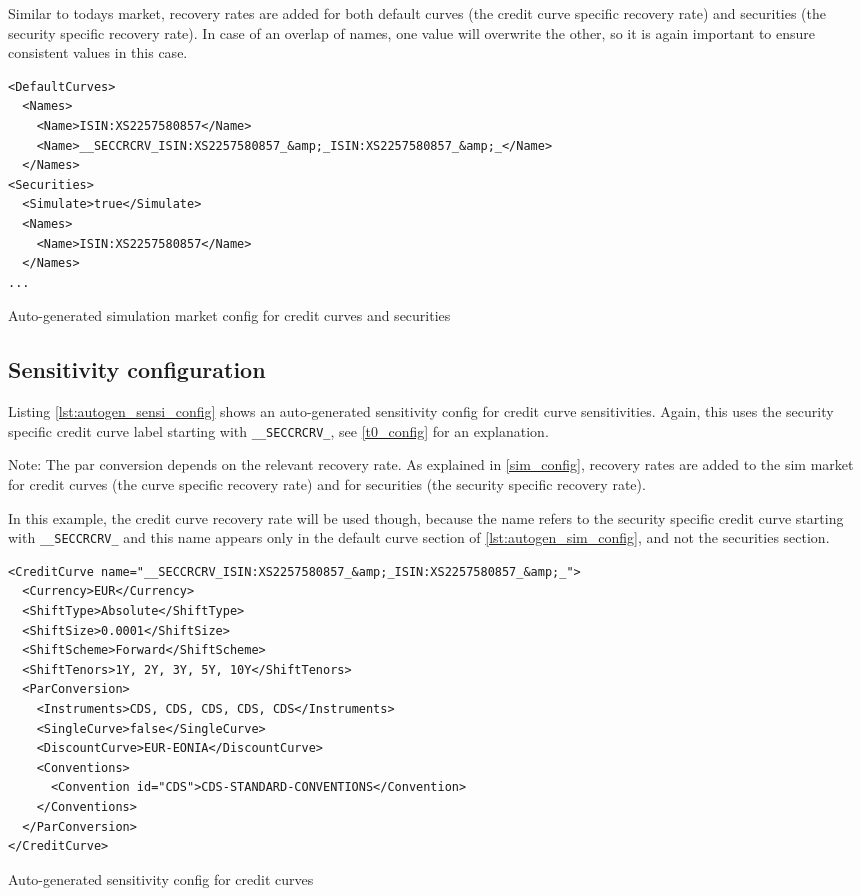 \documentclass[12pt, a4paper]{article}
\begin{document}
Similar to todays market, recovery rates are added for both default curves (the credit curve specific recovery rate) and
securities (the security specific recovery rate). In case of an overlap of names, one value will overwrite the other, so
it is again important to ensure consistent values in this case.

\begin{listing}[H]
\begin{verbatim}
<DefaultCurves>
  <Names>
    <Name>ISIN:XS2257580857</Name>
    <Name>__SECCRCRV_ISIN:XS2257580857_&amp;_ISIN:XS2257580857_&amp;_</Name>
  </Names>
<Securities>
  <Simulate>true</Simulate>
  <Names>
    <Name>ISIN:XS2257580857</Name>
  </Names>
...
\end{verbatim}
\caption{Auto-generated simulation market config for credit curves and securities}
\label{lst:autogen_sim_config}
\end{listing}

\subsection{Sensitivity configuration}

Listing \ref{lst:autogen_sensi_config} shows an auto-generated sensitivity config for credit curve sensitivities. Again,
this uses the security specific credit curve label starting with \verb+__SECCRCRV_+, see \ref{t0_config} for an
explanation.

Note: The par conversion depends on the relevant recovery rate. As explained in \ref{sim_config}, recovery rates are
added to the sim market for credit curves (the curve specific recovery rate) and for securities (the security specific
recovery rate). 

In this example, the credit curve recovery rate will be used though, because the name refers to the security specific
credit curve starting with \verb+__SECCRCRV_+ and this name appears only in the default curve section of
\ref{lst:autogen_sim_config}, and not the securities section.

\begin{listing}[H]
\begin{verbatim}
<CreditCurve name="__SECCRCRV_ISIN:XS2257580857_&amp;_ISIN:XS2257580857_&amp;_">
  <Currency>EUR</Currency>
  <ShiftType>Absolute</ShiftType>
  <ShiftSize>0.0001</ShiftSize>
  <ShiftScheme>Forward</ShiftScheme>
  <ShiftTenors>1Y, 2Y, 3Y, 5Y, 10Y</ShiftTenors>
  <ParConversion>
    <Instruments>CDS, CDS, CDS, CDS, CDS</Instruments>
    <SingleCurve>false</SingleCurve>
    <DiscountCurve>EUR-EONIA</DiscountCurve>
    <Conventions>
      <Convention id="CDS">CDS-STANDARD-CONVENTIONS</Convention>
    </Conventions>
  </ParConversion>
</CreditCurve>
\end{verbatim}
\caption{Auto-generated sensitivity config for credit curves}
\label{lst:autogen_sensi_config}
\end{listing}
\end{document}

